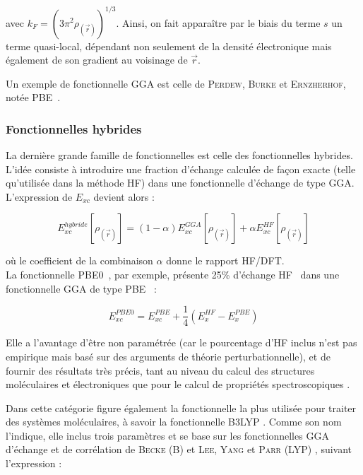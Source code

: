 	\noindent avec $k_{F} = (3 \pi^{2} \rho_{(\vec{r})})^{1/3}$. Ainsi, on fait apparaître par le biais du terme $s$ un terme quasi-local, dépendant non seulement de la densité électronique mais également de son gradient au voisinage de $\vec{r}$.
	
	Un exemple de fonctionnelle GGA est celle de \textsc{Perdew}, \textsc{Burke} et \textsc{Ernzherhof}, notée PBE~\cite{perdew1996generalized}.
	
	\subsubsection{Fonctionnelles hybrides}
	
	La dernière grande famille de fonctionnelles est celle des fonctionnelles hybrides. L’idée consiste à introduire une fraction d’échange calculée de façon exacte (telle qu’utilisée dans la méthode HF) dans une fonctionnelle d’échange de type GGA. L’expression de $E_{xc}$ devient alors :
	
	\begin{equation}
	E_{xc}^{hybride}[\rho_{(\vec{r})}] = (1- \alpha) E_{xc}^{GGA}[\rho_{(\vec{r})}] + \alpha E_{xc}^{HF}[\rho_{(\vec{r})}]
	\end{equation}
	
	\noindent où le coefficient de la combinaison $\alpha$ donne le rapport HF/DFT. \\
	La fonctionnelle PBE0~\cite{adamo1999toward}, par exemple, présente 25\% d’échange HF~\cite{adamo1997toward} dans une fonctionnelle GGA de type PBE~\cite{perdew1996generalized} :
	
	\begin{equation}
	E_{xc}^{PBE0} = E_{xc}^{PBE} + \frac{1}{4} (E_{x}^{HF} - E_{x}^{PBE})
	\end{equation}
	
	Elle a l’avantage d’être non paramétrée (car le pourcentage d’HF inclus n’est pas empirique mais basé sur des arguments de théorie perturbationnelle), et de fournir des résultats très précis, tant au niveau du calcul des structures moléculaires et électroniques que pour le calcul de propriétés spectroscopiques \cite{adamo1999toward}.
	
	Dans cette catégorie figure également la fonctionnelle la plus utilisée pour traiter des systèmes moléculaires, à savoir la fonctionnelle B3LYP \cite{becke1993density}. Comme son nom l’indique, elle inclus trois paramètres et se base sur les fonctionnelles GGA d’échange et de corrélation de \textsc{Becke} (B) \cite{becke1988density} et \textsc{Lee}, \textsc{Yang} et \textsc{Parr} (LYP) \cite{chengteh1988development}, suivant l’expression :
	
